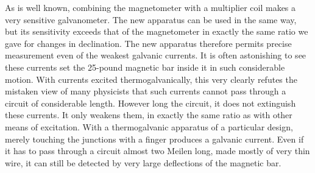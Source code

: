 As is well known, combining the magnetometer with a multiplier coil makes a very sensitive galvanometer. The new apparatus can be used in the same way, but its sensitivity exceeds that of the magnetometer in exactly the same ratio we gave for changes in declination. The new apparatus therefore permits precise measurement even of the weakest galvanic currents. It is often astonishing to see these currents set the 25-pound magnetic bar inside it in such considerable motion. With currents excited thermogalvanically, this very clearly refutes the mistaken view of many physicists that such currents cannot pass through a circuit of considerable length. However long the circuit, it does not extinguish these currents. It only weakens them, in exactly the same ratio as with other means of excitation. With a thermogalvanic apparatus of a particular design, merely touching the junctions with a finger produces a galvanic current. Even if it has to pass through a circuit almost two Meilen long, made mostly of very thin wire, it can still be detected by very large deflections of the magnetic bar.

